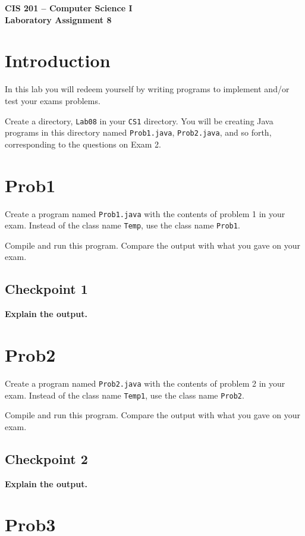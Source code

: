 \documentclass[12pt]{article}
\newcommand{\fname}{\texttt}
\begin{document}
\sloppypar

\begin{center}
\Large\bf
CIS 201 -- Computer Science I\\
Laboratory Assignment 8\\
\end{center}

\section*{Introduction}

In this lab you will redeem yourself
by writing programs to implement and/or test your exams problems.

Create a directory, \fname{Lab08} in your \fname{CS1} directory.
You will be creating Java programs in this directory
named \verb'Prob1.java', \verb'Prob2.java', and so forth,
corresponding to the questions on Exam 2.

\section*{Prob1}

Create a program named \verb'Prob1.java' with the contents
of problem 1 in your exam.
Instead of the class name \verb'Temp', use the class name \verb'Prob1'.

Compile and run this program.
Compare the output with what you gave on your exam.

\subsection*{Checkpoint 1}
{\bf 
Explain the output.
}

\section*{Prob2}

Create a program named \verb'Prob2.java' with the contents
of problem 2 in your exam.
Instead of the class name \verb'Temp1', use the class name \verb'Prob2'.

Compile and run this program.
Compare the output with what you gave on your exam.

\subsection*{Checkpoint 2}
{\bf 
Explain the output.
}

\section*{Prob3}
\end{document}
